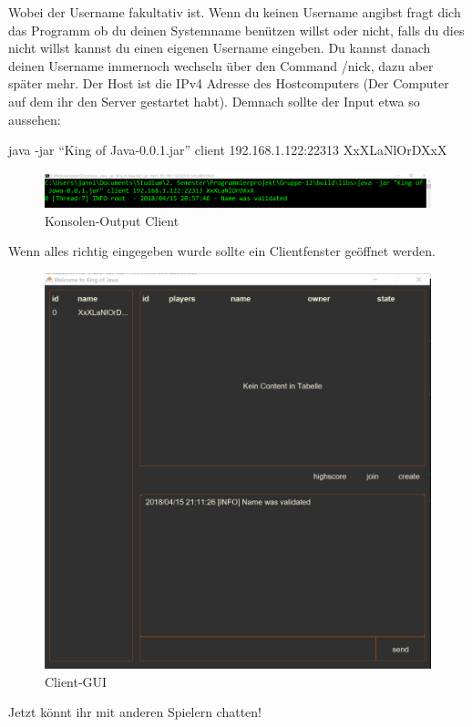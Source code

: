 \documentclass{scrartcl}
\newcommand{\n}{\newline}
\begin{document}
Wobei der Username fakultativ ist. Wenn du keinen Username angibst fragt dich das Programm ob du deinen Systemname benützen willst oder nicht, falls du dies nicht willst kannst du einen eigenen Username eingeben. Du kannst danach deinen Username immernoch wechseln über den Command /nick, dazu aber später mehr. \n
Der Host ist die IPv4 Adresse des Hostcomputers (Der Computer auf dem ihr den Server gestartet habt). Demnach sollte der Input etwa so aussehen:
\begin{center}
    java -jar “King of Java-0.0.1.jar” client 192.168.1.122:22313 XxXLaNlOrDXxX
\end{center}
\begin{figure}[H]
	\includegraphics[width=\linewidth]{CMDclient.png}
	\caption{Konsolen-Output Client}
	\label{fig:map1}
\end{figure}
\pagebreak
Wenn alles richtig eingegeben wurde sollte ein Clientfenster geöffnet werden.
\begin{figure}[H]
	\includegraphics[width=\linewidth]{GUIclient.png}
	\caption{Client-GUI}
	\label{fig:map1}
\end{figure}
Jetzt könnt ihr mit anderen Spielern chatten!
\end{document}
